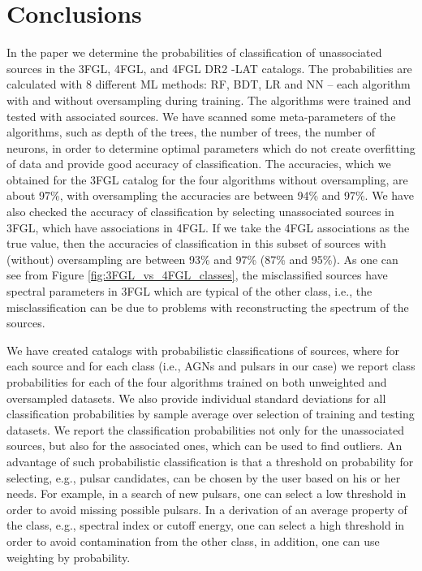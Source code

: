 \section{Conclusions}

In the paper we determine the probabilities of classification of unassociated sources in the 3FGL, 4FGL, and 4FGL DR2 \Fermi-LAT catalogs.
The probabilities are calculated with 8 different ML methods: RF, BDT, LR and NN -- each algorithm with and without oversampling during training.
The algorithms were trained and tested with associated sources.
We have scanned some meta-parameters of the algorithms, such as depth of the trees, the number of trees, the number of neurons, in order to determine optimal parameters which do not create overfitting of data and provide good accuracy of classification.
The accuracies, which we obtained for the 3FGL catalog for the four algorithms without oversampling, are about 97\%, with oversampling the accuracies are between 94\% and 97\%.
We have also checked the accuracy of classification by selecting unassociated sources in 3FGL, which have associations in 4FGL.
If we take the 4FGL associations as the true value, then the accuracies of classification in this subset of sources 
with (without) oversampling are between 93\% and 97\% (87\% and 95\%).
As one can see from Figure \ref{fig:3FGL_vs_4FGL_classes}, the misclassified sources have spectral parameters in 3FGL which are typical of the other class, i.e., the misclassification can be due to problems with reconstructing the spectrum of the sources.

We have created catalogs with probabilistic classifications of sources, where for each source and for each class (i.e., AGNs and pulsars in our case) we report class probabilities for each of the four algorithms trained on both unweighted and oversampled datasets. 
We also provide individual standard deviations for all classification probabilities by sample average over selection of training and testing datasets.
We report the classification probabilities not only for the unassociated sources, but also for the associated ones, which can be used to find outliers.
An advantage of such probabilistic classification is that a threshold on probability for selecting, e.g., pulsar candidates, can be chosen by the user based on his or her needs.
For example, in a search of new pulsars, one can select a low threshold in order to avoid missing possible pulsars.
In a derivation of an average property of the class, e.g., spectral index or cutoff energy, one can select a high threshold in order to avoid contamination from the other class, in addition, one can use weighting by probability.

